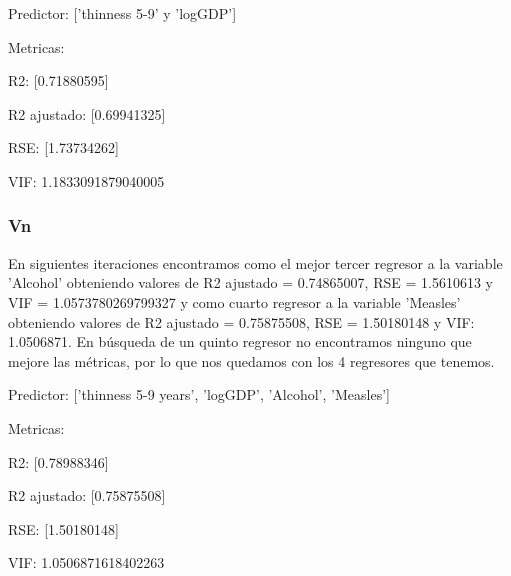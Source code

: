 Predictor: ['thinness 5-9' y 'logGDP']

Metricas:

R2: [0.71880595]

R2 ajustado: [0.69941325]

RSE: [1.73734262]

VIF: 1.1833091879040005

\subsubsection{Vn}

En siguientes iteraciones encontramos como el mejor tercer regresor a la variable 'Alcohol' obteniendo valores de R2 ajustado = 0.74865007, RSE = 1.5610613 y 
VIF = 1.0573780269799327 y como cuarto regresor a la variable 'Measles' obteniendo valores de R2 ajustado = 0.75875508, RSE = 1.50180148 y VIF: 1.0506871. En búsqueda de un quinto regresor no encontramos ninguno que mejore las métricas, por lo que nos quedamos con los 4 regresores que tenemos. 

Predictor: ['thinness 5-9 years', 'logGDP', 'Alcohol', 'Measles']

Metricas:

R2: [0.78988346]

R2 ajustado: [0.75875508]

RSE: [1.50180148]

VIF: 1.0506871618402263
